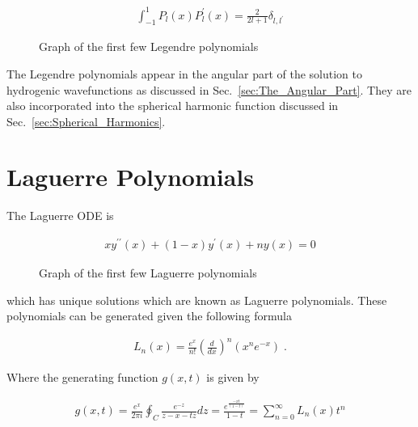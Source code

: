         \begin{align}
            \int_{-1}^1 P_l(x) P_l^\prime(x) = \frac{2}{2l + 1}\delta_{l,l^\prime}
        \end{align}

        \begin{figure}[ht!]
            \centering
            \resizebox{0.8\linewidth}{!}{}
            \caption{Graph of the first few Legendre polynomials}
            \label{img:Legendre_polynomials}
        \end{figure}

        \noindent The Legendre polynomials appear in the angular part of the solution to hydrogenic wavefunctions as discussed in Sec.~\ref{sec:The_Angular_Part}. They are also incorporated into the spherical harmonic function discussed in Sec.~\ref{sec:Spherical_Harmonics}.

        \section{Laguerre Polynomials} \label{sec:Laguerre_Polynomial}
        The Laguerre ODE is 

        \begin{align}
            xy^{\prime \prime}(x) + (1 - x)y^\prime(x) + ny(x) = 0 
        \end{align}


        \begin{figure}[h]
            \centering
            \resizebox{0.8\linewidth}{!}{}
            \caption{Graph of the first few Laguerre polynomials}
            \label{img:Laguerre_polynomials}
        \end{figure}

        \noindent which has unique solutions which are known as Laguerre polynomials. These polynomials can be generated given the following formula 

        \begin{align}
            L_n(x) = \frac{e^x}{n!} \left( \frac{d}{dx} \right)^n (x^ne^{-x})\;.
        \end{align}

        \noindent Where the generating function $g(x, t)$ is given by \cite{Arfken_Weber_Arfken_Weber_2008}

        \begin{align}
            g(x, t) = \frac{e^x}{2\pi i} \oint_C \frac{e^{-z}}{z - x - tz} dz = \frac{e^{\frac{-xt}{(1 - t)}}}{1 - t} = \sum_{n = 0}^\infty L_n(x) t^n
        \end{align}

